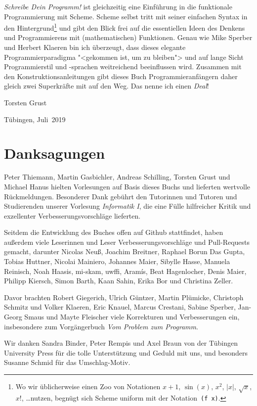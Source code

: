 \textit{Schreibe Dein Programm!} ist gleichzeitig eine Einführung in die
funktionale Programmierung mit Scheme.  Scheme selbst tritt mit seiner
einfachen Syntax in den Hintergrund\footnote{Wo wir üblicherweise einen
Zoo von Notationen $x+1$, $\sin(x)$, $x^2$, $\vert x\vert$, $\sqrt{x}$,
$x!$, \dots nutzen, begnügt sich Scheme uniform mit der
Notation~\texttt{(f~x)}.} und gibt den Blick frei auf die essentiellen
Ideen des Denkens und Programmierens mit (mathematischen) Funktionen.
Genau wie Mike Sperber und Herbert Klaeren bin ich überzeugt, dass
dieses elegante Programmierparadigma "<gekommen ist, um zu bleiben"> und
auf lange Sicht Programmierstil und -sprachen weitreichend beeinflussen
wird.  Zusammen mit den Konstruktionsanleitungen gibt dieses Buch
Programmieranfängern daher gleich zwei Superkräfte mit auf den Weg.  Das
nenne ich einen \emph{Deal}!
%
\begin{flushright}
  Torsten Grust

  Tübingen, Juli~2019
\end{flushright}

\section*{Danksagungen}

Peter Thiemann, Martin Gasbichler, Andreas Schilling, Torsten Grust und Michael Hanus hielten
Vorlesungen auf Basis dieses Buchs und lieferten wertvolle Rückmeldungen.
Besonderer Dank gebührt den Tutorinnen und Tutoren und Studierenden unserer Vorlesung
\textit{Informatik I}, die eine
Fülle hilfreicher Kritik und exzellenter Verbesserungsvorschläge
lieferten.

Seitdem die Entwicklung des Buches offen auf Github stattfindet, haben
außerdem viele Leserinnen und Leser Verbesserungsvorschläge und
Pull-Requests gemacht, darunter Nicolas Neuß, Joachim Breitner,
Raphael Borun Das Gupta, Tobias Huttner, Nicolai Mainiero, Johannes
Maier, Sibylle Hasse, Manuela Reinisch, Noah Haasis, mi-skam, uwffi, 
Aramís, Beat Hagenlocher, Denis Maier, Philipp Kiersch, Simon Barth,
Kaan Sahin, Erika Bor und Christina Zeller.

Davor brachten Robert Giegerich, Ulrich Güntzer, Martin Plümicke,
Christoph Schmitz und Volker Klaeren, Eric Knauel, Marcus Crestani,
Sabine Sperber, Jan-Georg Smaus und Mayte Fleischer viele Korrekturen
und Verbesserungen ein, insbesondere zum Vorgängerbuch \textit{Vom
  Problem zum Programm}.

Wir danken Sandra Binder, Peter Rempis und Axel Braun von der Tübingen
University Press für die tolle Unterstützung und Geduld mit uns,
und besonders Susanne Schmid für das Umschlag-Motiv.

